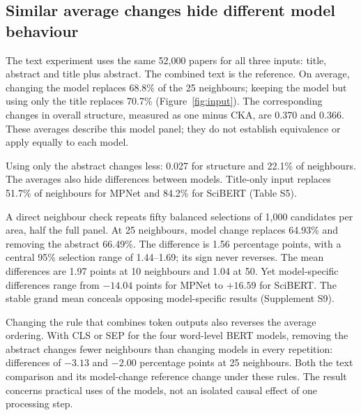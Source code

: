 \documentclass[12pt]{article}
\begin{document}
\subsection{Similar average changes hide different model behaviour}
The text experiment uses the same 52,000 papers for all three inputs: title, abstract and title plus abstract. The combined text is the reference. On average, changing the model replaces 68.8\% of the 25 neighbours; keeping the model but using only the title replaces 70.7\% (Figure~\ref{fig:input}). The corresponding changes in overall structure, measured as one minus CKA, are 0.370 and 0.366. These averages describe this model panel; they do not establish equivalence or apply equally to each model.

Using only the abstract changes less: 0.027 for structure and 22.1\% of neighbours. The averages also hide differences between models. Title-only input replaces 51.7\% of neighbours for MPNet and 84.2\% for SciBERT (Table S5).

A direct neighbour check repeats fifty balanced selections of 1,000 candidates per area, half the full panel. At 25 neighbours, model change replaces 64.93\% and removing the abstract 66.49\%. The difference is 1.56 percentage points, with a central 95\% selection range of 1.44--1.69; its sign never reverses. The mean differences are 1.97 points at 10 neighbours and 1.04 at 50. Yet model-specific differences range from $-14.04$ points for MPNet to $+16.59$ for SciBERT. The stable grand mean conceals opposing model-specific results (Supplement S9).

Changing the rule that combines token outputs also reverses the average ordering. With CLS or SEP for the four word-level BERT models, removing the abstract changes fewer neighbours than changing models in every repetition: differences of $-3.13$ and $-2.00$ percentage points at 25 neighbours. Both the text comparison and its model-change reference change under these rules. The result concerns practical uses of the models, not an isolated causal effect of one processing step.
\end{document}
